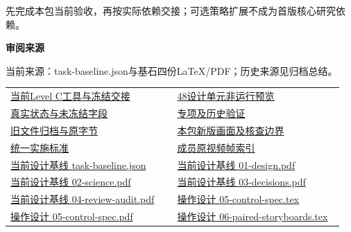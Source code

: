 \documentclass[11pt,a4paper]{article}
\newcommand{\reviewsubsection}[1]{\par\Needspace{4\baselineskip}\vspace{4pt}\begin{center}{\titlelatin\titlecjk\bfseries\fontsize{12}{18}\selectfont #1}\end{center}}
\begin{document}
先完成本包当前验收，再按实际依赖交接；可选策略扩展不成为首版核心研究依赖。


\begin{minipage}{\linewidth}
\reviewsubsection{3.4 审阅来源}
当前来源：task-\allowbreak{}baseline.json与基石四份LaTeX/\allowbreak{}PDF；历史来源见归档总结。


\begingroup\small\setlength{\tabcolsep}{4pt}\begin{tabular}{@{}p{0.48\linewidth}p{0.48\linewidth}@{}}
\href{file:///D:/Agent/srp/agent/tasks/Q-03/outputs/current-level-c.md}{当前Level C工具与冻结交接} & \href{file:///D:/Agent/srp/agent/tasks/Q-03/outputs/design-cell-preview.json}{48设计单元非运行预览}\\[4pt]
\href{file:///D:/Agent/srp/agent/tasks/Q-03/outputs/current-level-c.json}{真实状态与未冻结字段} & \href{file:///D:/Agent/srp/agent/tasks/Q-03/evidence/verification.json}{专项及历史验证}\\[4pt]
\href{file:///D:/Agent/srp/agent/tasks/Q-03/archive/README.md}{旧文件归档与原字节} & \href{file:///D:/Agent/srp/agent/tasks/Q-03/outputs/current-implementation-evidence.md}{本包新版画面及核查边界}\\[4pt]
\href{file:///D:/Agent/srp/agent/design/weather/2026-10-08_Storm\%E4\%B8\%8E\%E7\%BA\%AF\%E7\%B2\%92\%E5\%AD\%90\%E5\%8F\%8C\%E7\%8E\%AF\%E5\%AE\%9E\%E6\%96\%BD\%E6\%A0\%87\%E5\%87\%86.md}{统一实施标准} & \href{file:///D:/Agent/srp/human/assets/previews/2026-10-08/member-storm-particle-rings/frame-index.json}{成员原视频帧索引}\\[4pt]
\href{file:///D:/Agent/srp/agent/design/design-foundation-20261008/task-baseline.json}{当前设计基线 task-\allowbreak{}baseline.json} & \href{file:///D:/Agent/srp/agent/design/design-foundation-20261008/01-design.pdf}{当前设计基线 01-\allowbreak{}design.pdf}\\[4pt]
\href{file:///D:/Agent/srp/agent/design/design-foundation-20261008/02-science.pdf}{当前设计基线 02-\allowbreak{}science.pdf} & \href{file:///D:/Agent/srp/agent/design/design-foundation-20261008/03-decisions.pdf}{当前设计基线 03-\allowbreak{}decisions.pdf}\\[4pt]
\href{file:///D:/Agent/srp/agent/design/design-foundation-20261008/04-review-audit.pdf}{当前设计基线 04-\allowbreak{}review-\allowbreak{}audit.pdf} & \href{file:///D:/Agent/srp/agent/design/design-foundation-20261008/05-control-spec.tex}{操作设计 05-\allowbreak{}control-\allowbreak{}spec.tex}\\[4pt]
\href{file:///D:/Agent/srp/agent/design/design-foundation-20261008/05-control-spec.pdf}{操作设计 05-\allowbreak{}control-\allowbreak{}spec.pdf} & \href{file:///D:/Agent/srp/agent/design/design-foundation-20261008/06-paired-storyboards.tex}{操作设计 06-\allowbreak{}paired-\allowbreak{}storyboards.tex}\\[4pt]

\end{tabular}
\end{minipage}
\end{document}

